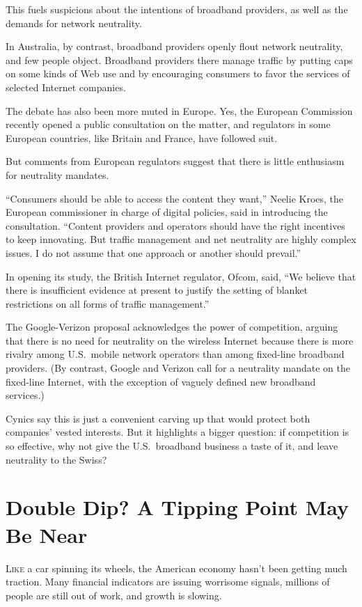 ﻿\documentclass[12pt]{article}
\begin{document}
This fuels suspicions about the intentions of broadband providers, as well as the demands for
network neutrality.

In Australia, by contrast, broadband providers openly flout network neutrality, and few people
object. Broadband providers there manage traffic by putting caps on some kinds of Web use and by
encouraging consumers to favor the services of selected Internet companies.

The debate has also been more muted in Europe. Yes, the European Commission recently opened a public
consultation on the matter, and regulators in some European countries, like Britain and France, have
followed suit.

But comments from European regulators suggest that there is little enthusiasm for neutrality
mandates.

``Consumers should be able to access the content they want,'' Neelie Kroes, the European
commissioner in charge of digital policies, said in introducing the consultation. ``Content
providers and operators should have the right incentives to keep innovating. But traffic management
and net neutrality are highly complex issues. I do not assume that one approach or another should
prevail.''

In opening its study, the British Internet regulator, Ofcom, said, ``We believe that there is
insufficient evidence at present to justify the setting of blanket restrictions on all forms of
traffic management.''

The Google-Verizon proposal acknowledges the power of competition, arguing that there is no need for
neutrality on the wireless Internet because there is more rivalry among U.S.~mobile network
operators than among fixed-line broadband providers. (By contrast, Google and Verizon call for a
neutrality mandate on the fixed-line Internet, with the exception of vaguely defined new broadband
services.)

Cynics say this is just a convenient carving up that would protect both companies' vested interests.
But it highlights a bigger question: if competition is so effective, why not give the U.S.~broadband
business a taste of it, and leave neutrality to the Swiss?

\section{Double Dip? A Tipping Point May Be Near}

\lettrine{L}{ike} a car spinning its wheels, the American economy hasn't
been getting much traction. Many financial indicators are issuing worrisome signals, millions of
people are still out of work, and growth is slowing.
\end{document}
